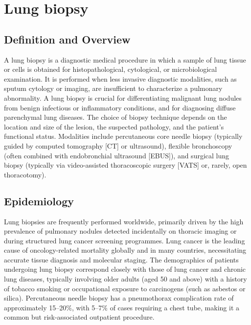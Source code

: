 \chapter{Lung biopsy}

\section*{Definition and Overview}
A lung biopsy is a diagnostic medical procedure in which a sample of lung tissue or cells is obtained for histopathological, cytological, or microbiological examination. It is performed when less invasive diagnostic modalities, such as sputum cytology or imaging, are insufficient to characterize a pulmonary abnormality. A lung biopsy is crucial for differentiating malignant lung nodules from benign infectious or inflammatory conditions, and for diagnosing diffuse parenchymal lung diseases. The choice of biopsy technique depends on the location and size of the lesion, the suspected pathology, and the patient's functional status. Modalities include percutaneous core needle biopsy (typically guided by computed tomography [CT] or ultrasound), flexible bronchoscopy (often combined with endobronchial ultrasound [EBUS]), and surgical lung biopsy (typically via video-assisted thoracoscopic surgery [VATS] or, rarely, open thoracotomy).

\section*{Epidemiology}
Lung biopsies are frequently performed worldwide, primarily driven by the high prevalence of pulmonary nodules detected incidentally on thoracic imaging or during structured lung cancer screening programmes. Lung cancer is the leading cause of oncology-related mortality globally and in many countries, necessitating accurate tissue diagnosis and molecular staging. The demographics of patients undergoing lung biopsy correspond closely with those of lung cancer and chronic lung diseases, typically involving older adults (aged 50 and above) with a history of tobacco smoking or occupational exposure to carcinogens (such as asbestos or silica). Percutaneous needle biopsy has a pneumothorax complication rate of approximately 15--20\%, with 5--7\% of cases requiring a chest tube, making it a common but risk-associated outpatient procedure.

